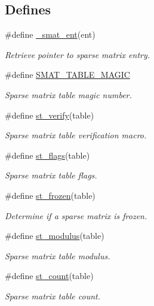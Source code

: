 \subsection*{Defines}
\begin{CompactItemize}
\item 
\#define \hyperlink{group__dbprim__smat_ga32}{\_\-smat\_\-ent}(ent)
\begin{CompactList}\small\item\em Retrieve pointer to sparse matrix entry. \item\end{CompactList}\item 
\#define \hyperlink{group__dbprim__smat_ga33}{SMAT\_\-TABLE\_\-MAGIC}
\begin{CompactList}\small\item\em Sparse matrix table magic number. \item\end{CompactList}\item 
\#define \hyperlink{group__dbprim__smat_ga34}{st\_\-verify}(table)
\begin{CompactList}\small\item\em Sparse matrix table verification macro. \item\end{CompactList}\item 
\#define \hyperlink{group__dbprim__smat_ga35}{st\_\-flags}(table)
\begin{CompactList}\small\item\em Sparse matrix table flags. \item\end{CompactList}\item 
\#define \hyperlink{group__dbprim__smat_ga36}{st\_\-frozen}(table)
\begin{CompactList}\small\item\em Determine if a sparse matrix is frozen. \item\end{CompactList}\item 
\#define \hyperlink{group__dbprim__smat_ga37}{st\_\-modulus}(table)
\begin{CompactList}\small\item\em Sparse matrix table modulus. \item\end{CompactList}\item 
\#define \hyperlink{group__dbprim__smat_ga38}{st\_\-count}(table)
\begin{CompactList}\small\item\em Sparse matrix table count. \item\end{CompactList}\item 

\end{CompactItemize}
